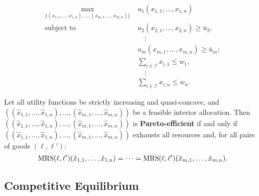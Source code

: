 \documentclass[8pt,a4paper]{extarticle}
\begin{document}
\begin{multicols}{3}
  \begin{equation*}
    \begin{aligned}
      \max_{\{ (x_{1, 1}, \ldots, x_{1, n}), \ldots, (x_{m, 1}, \ldots, x_{m, n})  \}}\  & u_1 (x_{1, 1}, \ldots, x_{1, n}) \quad         \\
      \text{subject to} \quad                                                            & u_2 (x_{2, 1}, \ldots, x_{2, n}) \ge \bar{u}_2, \\
                                                                                         & \quad \vdots                                   \\
                                                                                         & u_m (x_{m, 1}, \ldots, x_{m, n}) \ge \bar{u}_m; \\
                                                                                         & \sum_{i \in \mathcal{I}} x_{i, 1} \le w_1 ,         \\
                                                                                         & \quad \vdots                                   \\
                                                                                         & \sum_{i \in \mathcal{I}} x_{i, n} \le w_n.
    \end{aligned}
  \end{equation*}

  \begin{boxtheo}
    Let all utility functions be strictly increasing and quasi-concave, and	$((\hat{x}_{1,1}, \ldots, \hat{x}_{1, n}), \ldots, (\hat{x}_{m, 1}, \ldots, \hat{x}_{m, n}))$ be a feasible interior allocation. Then $((\hat{x}_{1,1}, \ldots, \hat{x}_{1, n}), \ldots, (\hat{x}_{m, 1}, \ldots, \hat{x}_{m, n}))$ is \textbf{Pareto-efficient} if and only if $((\hat{x}_{1,1}, \ldots, \hat{x}_{1, n}), \ldots, (\hat{x}_{m, 1}, \ldots, \hat{x}_{m, n}))$ exhausts all resources and, for all pairs of goods $(\ell,\ell')$:
    \[
      \text{\normalfont MRS}(\ell, \ell') (\hat{x}_{1,1}, \ldots, \hat{x}_{1, n}) = \cdots = \text{\normalfont MRS}(\ell, \ell') (\hat{x}_{m,1}, \ldots, \hat{x}_{m, n})
      .\]
  \end{boxtheo}

  \newpage

  \subsection{Competitive Equilibrium}


\end{multicols}
\end{document}

